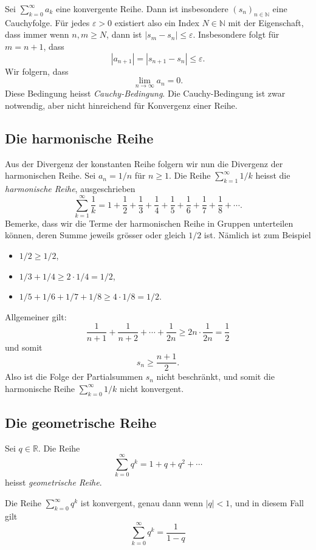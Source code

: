 \documentclass[../main.tex]{subfiles}
\begin{document}
\begin{remark}
  Sei $\sum_{k=0}^{\infty} a_k$ eine konvergente Reihe.
  Dann ist insbesondere ${(s_{n})}_{n \in \mathbb{N}}$ 
  eine Cauchyfolge.
  Für jedes $\varepsilon > 0$ existiert also ein Index
  $N \in \mathbb{N}$ mit der Eigenschaft, dass
  immer wenn $n, m \geq N$, dann ist
  \(
    |s_m - s_n| \leq \varepsilon.
  \)
  Insbesondere folgt für $m = n + 1$, dass
  \[
    |a_{n+1}| = |s_{n+1} - s_n| \leq \varepsilon.
  \]
  Wir folgern, dass
  \[
    \lim_{n \to \infty}a_n = 0.
  \]
  Diese Bedingung heisst  \emph{Cauchy-Bedingung}.
  Die Cauchy-Bedingung ist zwar notwendig, aber nicht
  hinreichend für Konvergenz einer Reihe.
\end{remark}

\subsection*{Die harmonische Reihe}
Aus der Divergenz der konstanten Reihe folgern wir
nun die Divergenz der harmonischen Reihe.
Sei $a_n = 1/n$ für $n \geq 1$. Die Reihe
$\sum_{k=1}^{\infty} 1/k$ heisst die
\emph{harmonische Reihe}, ausgeschrieben
\[
  \sum_{k=1}^{\infty} \frac{1}{k} = 
  1 + \frac{1}{2} + \frac{1}{3}
  + \frac{1}{4}
  + \frac{1}{5}
  + \frac{1}{6}
  + \frac{1}{7}
  + \frac{1}{8}
  + \cdots.
\]
Bemerke, dass wir die Terme der harmonischen Reihe
in Gruppen unterteilen können, deren Summe
jeweils grösser oder gleich $1/2$ ist. Nämlich ist
zum Beispiel
\begin{itemize}
  \item $1/2 \geq 1/2$,
  \item $1/3 + 1/4 \geq 2\cdot 1/4 = 1/2$,
  \item $1/5 + 1/6 + 1/7 + 1/8 \geq 4 \cdot 1/8 = 1/2$.
\end{itemize}
Allgemeiner gilt:
\[
  \frac{1}{n+1} + \frac{1}{n+2} + \cdots + \frac{1}{2n}
  \geq 2n \cdot \frac{1}{2n} = \frac{1}{2}
\]
und somit
\[
  s_n \geq \frac{n + 1}{2}.
\]
Also ist die Folge der Partialsummen $s_n$ nicht
beschränkt, und somit die 
harmonische Reihe 
$\sum_{k=0}^{\infty} 1/k$ nicht konvergent.

\subsection*{Die geometrische Reihe}
Sei $q \in \mathbb{R}$. Die Reihe
\[
  \sum_{k=0}^{\infty} q^k = 1 + q + q^2 + \cdots
\]
heisst \emph{geometrische Reihe}.


\begin{claim}
  Die Reihe
  $\sum_{k=0}^{\infty} q^k$ ist konvergent, genau dann
  wenn $|q| < 1$, und in diesem Fall gilt
  \[
    \sum_{k=0}^{\infty} q^k = \frac{1}{1-q}
  \]
\end{claim}
\end{document}
